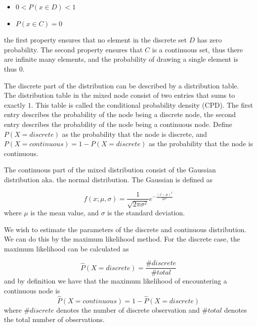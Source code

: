\documentclass[10pt, journal, compsoc, a4paper]{IEEEtran}
\begin{document}
\begin{center}
  \begin{itemize}
    \item $0 < P(x \in D) < 1$
    \item $P(x \in C) = 0$
  \end{itemize}   
\end{center}
the first property ensures that no element in the discrete set $D$ has zero probability. The second property ensures that $C$ is a continuous set, thus there are infinite many elements, and the probability of drawing a single element is thus $0$. 

The discrete part of the distribution can be described by a distribution table. The distribution table in the mixed node consist of two entries that sums to exactly $1$. This table is called the conditional probability density (CPD). The first entry describes the probability of the node being a discrete node, the second entry describes the probability of the node being a continuous node. Define $P(X = discrete)$ as the probability that the node is discrete, and $P(X = continuous) = 1-P(X = discrete)$ as the probability that the node is continuous. 

The continuous part of the mixed distribution consist of the Gaussian distribution aka. the normal distribution. The Gaussian is defined as

\begin{equation}
f(x;\mu,\sigma) = \frac{1}{\sqrt{2\pi\sigma^2}} e^{ -\frac{(x-\mu)^2}{2\sigma^2} }  
\end{equation}
where $\mu$ is the mean value, and $\sigma$ is the standard deviation.

We wish to estimate the parameters of the discrete and continuous distribution. We can do this by the maximum likelihood method. For the discrete case, the maximum likelihood can be calculated as

\begin{equation}
  \hat{P}(X = discrete) = \frac{\#discrete}{\#total}
  \label{eq3} 
\end{equation}
and by definition we have that the maximum likelihood of encountering a continuous node is
\begin{equation}
  \hat{P}(X = continuous) = 1 - \hat{P}(X = discrete)
\end{equation}
where $\#discrete$ denotes the number of discrete observation and $\#total$ denotes the total number of observations.
\end{document}
